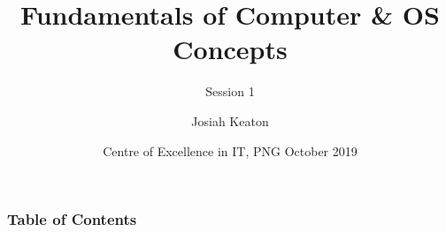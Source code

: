 \documentclass[hyperref={bookmarks=false},aspectratio=169]{beamer}
\title[Contents]
{\bfseries{Fundamentals of Computer \& OS Concepts}}
\subtitle{Session 1}
\author[] %
{Josiah Keaton\inst{1} } %
\institute[CEIT]
{
  \inst{1}
  Trainer\\
  Centre of Excellence in IT,PNG
}
\date[CEIT, 2014]
{Centre of Excellence in IT, PNG October 2019}
\begin{document}
\frame{\titlepage}  %

\begin{frame}
\frametitle{Table of Contents}
\tableofcontents
\end{frame}











%


%
%

%
\end{document}

